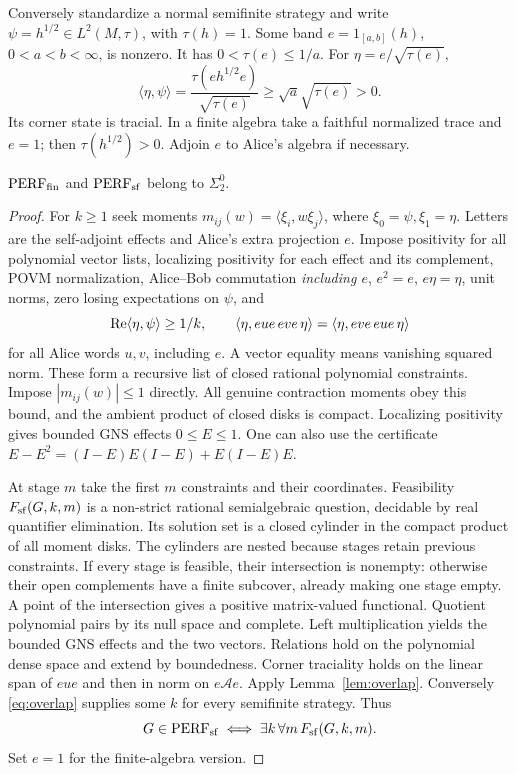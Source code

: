 Conversely standardize a normal semifinite strategy and write
$\psi=h^{1/2}\in L^2(M,\tau)$, with $\tau(h)=1$.
Some band $e=1_{[a,b]}(h)$, $0<a<b<\infty$, is nonzero.
It has $0<\tau(e)\leq1/a$. For $\eta=e/\sqrt{\tau(e)}$,
\begin{equation}\label{eq:overlap}
 \langle\eta,\psi\rangle
 =\frac{\tau(eh^{1/2}e)}{\sqrt{\tau(e)}}
 \geq\sqrt a\sqrt{\tau(e)}>0.
\end{equation}
Its corner state is tracial. In a finite algebra take a faithful
normalized trace and $e=1$; then $\tau(h^{1/2})>0$.
Adjoin $e$ to Alice's algebra if necessary.

\begin{theorem}\label{thm:upper}
$\mathrm{PERF}_{\mathrm{fin}}$ and $\mathrm{PERF}_{\mathrm{sf}}$ belong to $\Sigma^0_2$.
\end{theorem}
\begin{proof}
For $k\geq1$ seek moments $m_{ij}(w)=\langle\xi_i,w\xi_j\rangle$,
where $\xi_0=\psi,\xi_1=\eta$. Letters are the self-adjoint effects and
Alice's extra projection $e$. Impose positivity for all polynomial
vector lists, localizing positivity for each effect and its complement,
POVM normalization, Alice--Bob commutation \emph{including $e$},
$e^2=e$, $e\eta=\eta$, unit norms, zero losing expectations on $\psi$,
and
\[
 \operatorname{Re}\langle\eta,\psi\rangle\geq1/k,\qquad
 \langle\eta,eue\,eve\,\eta\rangle
 =\langle\eta,eve\,eue\,\eta\rangle
\]
for all Alice words $u,v$, including $e$.
A vector equality means vanishing squared norm.
These form a recursive list of closed rational polynomial constraints.
Impose $|m_{ij}(w)|\leq1$ directly. All genuine contraction moments obey
this bound, and the ambient product of closed disks is compact.
Localizing positivity gives bounded GNS effects $0\leq E\leq1$.
One can also use the certificate
$E-E^2=(I-E)E(I-E)+E(I-E)E$.

At stage $m$ take the first $m$ constraints and their coordinates.
Feasibility $F_{\mathrm{sf}}(G,k,m)$ is a non-strict rational semialgebraic
question, decidable by real quantifier elimination.
Its solution set is a closed cylinder in the compact product of all
moment disks. The cylinders are nested because stages retain previous
constraints. If every stage is feasible, their intersection is nonempty:
otherwise their open complements have a finite subcover, already making
one stage empty. A point of the intersection gives a positive
matrix-valued functional. Quotient polynomial pairs by its null space
and complete. Left multiplication yields the bounded GNS effects and
the two vectors. Relations hold on the polynomial dense space and
extend by boundedness. Corner traciality holds on the linear span of
$eue$ and then in norm on $e\mathcal A e$.
Apply Lemma~\ref{lem:overlap}. Conversely \eqref{eq:overlap} supplies some
$k$ for every semifinite strategy. Thus
\begin{equation}\label{eq:sigma2}
 G\in\mathrm{PERF}_{\mathrm{sf}}\iff\exists k\,\forall m\,F_{\mathrm{sf}}(G,k,m).
\end{equation}
Set $e=1$ for the finite-algebra version.
\end{proof}


